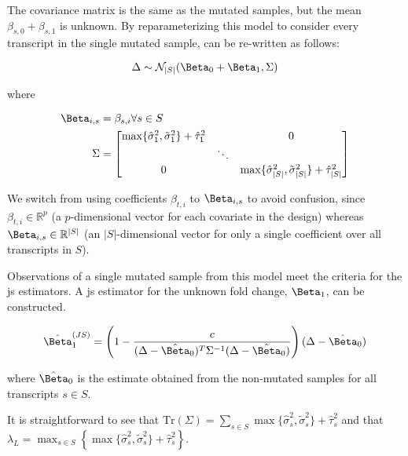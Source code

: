 The covariance matrix is the same as the mutated samples, but the mean $\beta_{s, 0} + \beta_{s, 1}$ is unknown.
By reparameterizing this model to consider every transcript in the single mutated sample,  can be re-written as follows:

\begin{equation}
  \Delta \sim \mathcal{N}_{|S|}(\Beta_0 + \Beta_1, \Sigma) \\
\end{equation}

where

\begin{align*}
  \Beta_{i,s} &= \beta_{s,i} \forall s \in S \\
  \Sigma &= \begin{bmatrix}
    \max\{ \hat{\sigma}_1^2, \tilde{\sigma}_1^2 \} + \hat{\tau}_1^2 & & 0 \\
    & \ddots & \\
    0 & & \max\{ \hat{\sigma}_{|S|}^2, \tilde{\sigma}_{|S|}^2 \} + \hat{\tau}_{|S|}^2 \\
  \end{bmatrix}
\end{align*}

We switch from using coefficients $\beta_{t,i}$ to $\Beta_{i,s}$ to avoid confusion, since $\beta_{t,i} \in \mathbb{R}^p$ (a $p$-dimensional vector for each covariate in the design) whereas $\Beta_{i,s} \in \mathbb{R}^{|S|}$ (an $|S|$-dimensional vector for only a single coefficient over all transcripts in $S$).

Observations of a single mutated sample from this model meet the criteria for the \gls{js} estimators.
A \gls{js} estimator for the unknown fold change, $\Beta_1$, can be constructed.

\begin{equation}
  \hat{\Beta}_1^{(JS)} = \left( 1 - \frac{c}{(\Delta - \hat{\Beta}_0)^T \Sigma^{-1} (\Delta - \hat{\Beta}_0)} \right)(\Delta - \hat{\Beta}_0)
  \label{eqn:js_defn}
\end{equation}

where $\hat{\Beta}_0$ is the estimate obtained from the non-mutated samples for all transcripts $s \in S$.

It is straightforward to see that $\text{Tr}(\Sigma) = \sum_{s \in S} \max\{ \hat{\sigma}_s^2, \tilde{\sigma}_s^2 \} + \hat{\tau}_s^2$ and that $\lambda_L = \max_{s \in S} \left\{ \max\{ \hat{\sigma}_s^2, \tilde{\sigma}_s^2 \} + \hat{\tau}_s^2 \right\}$.

